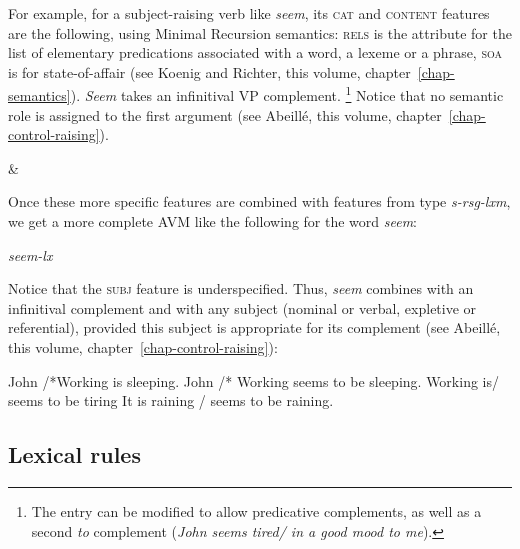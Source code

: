 \documentclass[output=paper
	        ,collection
	        ,collectionchapter
 	        ,biblatex
                ,babelshorthands
                ,newtxmath
                ,draftmode
                ,colorlinks, citecolor=brown
]{langscibook}
\begin{document}
For example, for a subject-raising verb like \emph{seem}, its \textsc{cat} and \textsc{content} features are the following, using Minimal Recursion semantics: \textsc{rels} is the attribute for the list of elementary predications associated with a word, a lexeme or a phrase, \textsc{soa} is for state-of-affair (see Koenig and Richter, this volume, chapter~\ref{chap-semantics}). \emph{Seem} takes an infinitival VP complement.%
%
\footnote{The entry can be modified to allow predicative complements, as well as a second \emph{to} complement (\emph{John seems tired/ in a good mood to me}).}
%
Notice that no semantic role is assigned to the first argument (see Abeillé, this volume, chapter~\ref{chap-control-raising}).

\ea\label{ex:prop23}
 \impl {} \&
\z

Once these more specific features are combined with features from type \emph{s-rsg-lxm}, we get a more complete AVM like the following for the word \emph{seem}:

\ea\label{ex:prop24}
\emph{seem-lx} \impl
{}
\z

Notice that the \textsc{subj} feature is underspecified. Thus, \emph{seem} combines with an infinitival complement and with any subject (nominal or verbal, expletive or referential), provided this subject is appropriate for its complement (see Abeillé, this volume, chapter~\ref{chap-control-raising}):

\ea\label{ex:prop25}
	\ea John /*Working is sleeping.
	\ex John /* Working seems to be sleeping.
	\ex Working is/ seems to be tiring
	\ex It is raining / seems to be raining.
	\z
\z

\subsection{Lexical rules}
\end{document}
